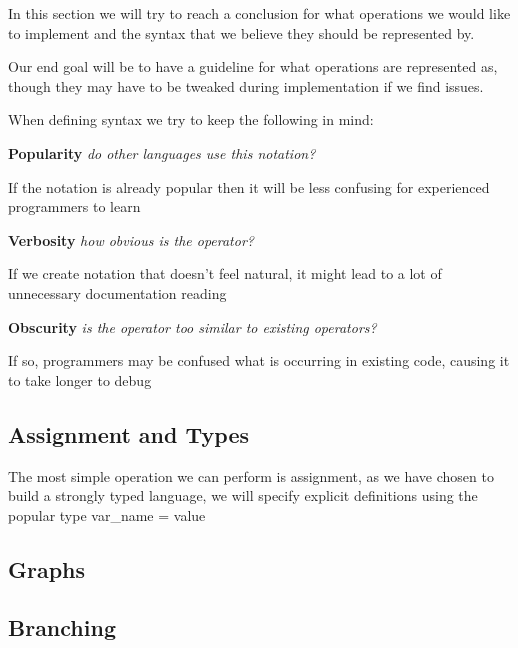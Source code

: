 In this section we will try to reach a conclusion for what operations we would like to implement and the syntax
that we believe they should be represented by.

Our end goal will be to have a guideline for what operations are represented as, though they may have to be tweaked
during implementation if we find issues.

\bigskip

\noindent
When defining syntax we try to keep the following in mind:

\noindent
\textbf{Popularity} \- \textit{do other languages use this notation?}

If the notation is already popular then it will be less confusing for experienced programmers to learn

\noindent
\textbf{Verbosity} \- \textit{how obvious is the operator?}

If we create notation that doesn't feel natural, it might lead to a lot of unnecessary documentation reading

\noindent
\textbf{Obscurity} \- \textit{is the operator too similar to existing operators?}

If so, programmers may be confused what is occurring in existing code, causing it to take longer to debug

\subsection{Assignment and Types}
The most simple operation we can perform is assignment, as we have chosen to build a strongly typed language, we will
specify explicit definitions using the popular {type} {var_name} = {value}

\subsection{Graphs}

\subsection{Branching}
